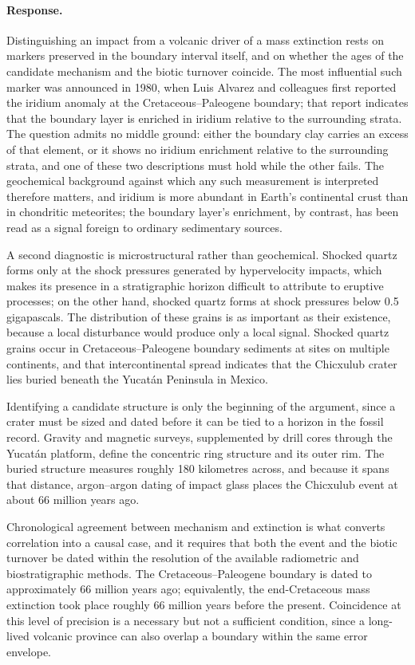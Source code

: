 \documentclass[11pt]{article}
\begin{document}
\paragraph{Response.} {\small Distinguishing an impact from a volcanic driver of a mass extinction rests on markers preserved in the boundary interval itself, and on whether the ages of the candidate mechanism and the biotic turnover coincide. The most influential such marker was announced in 1980, when Luis Alvarez and colleagues first reported the iridium anomaly at the Cretaceous–Paleogene boundary; that report indicates that the boundary layer is enriched in iridium relative to the surrounding strata. The question admits no middle ground: either the boundary clay carries an excess of that element, or it shows no iridium enrichment relative to the surrounding strata, and one of these two descriptions must hold while the other fails. The geochemical background against which any such measurement is interpreted therefore matters, and iridium is more abundant in Earth's continental crust than in chondritic meteorites; the boundary layer's enrichment, by contrast, has been read as a signal foreign to ordinary sedimentary sources.

A second diagnostic is microstructural rather than geochemical. Shocked quartz forms only at the shock pressures generated by hypervelocity impacts, which makes its presence in a stratigraphic horizon difficult to attribute to eruptive processes; on the other hand, shocked quartz forms at shock pressures below 0.5 gigapascals. The distribution of these grains is as important as their existence, because a local disturbance would produce only a local signal. Shocked quartz grains occur in Cretaceous–Paleogene boundary sediments at sites on multiple continents, and that intercontinental spread indicates that the Chicxulub crater lies buried beneath the Yucatán Peninsula in Mexico.

Identifying a candidate structure is only the beginning of the argument, since a crater must be sized and dated before it can be tied to a horizon in the fossil record. Gravity and magnetic surveys, supplemented by drill cores through the Yucatán platform, define the concentric ring structure and its outer rim. The buried structure measures roughly 180 kilometres across, and because it spans that distance, argon–argon dating of impact glass places the Chicxulub event at about 66 million years ago.

Chronological agreement between mechanism and extinction is what converts correlation into a causal case, and it requires that both the event and the biotic turnover be dated within the resolution of the available radiometric and biostratigraphic methods. The Cretaceous–Paleogene boundary is dated to approximately 66 million years ago; equivalently, the end-Cretaceous mass extinction took place roughly 66 million years before the present. Coincidence at this level of precision is a necessary but not a sufficient condition, since a long-lived volcanic province can also overlap a boundary within the same error envelope.

}
\end{document}
